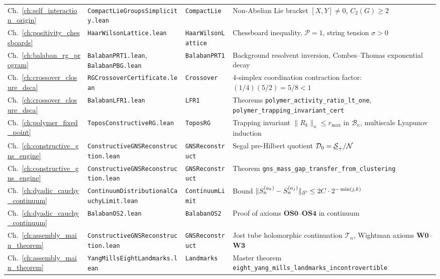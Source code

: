 \begin{table}[htbp]
\begin{tabular}{lllp{5.5cm}}
Ch.~\ref{ch:self_interaction_origin} & \texttt{CompactLieGroupsSimplicity.lean} & \texttt{CompactLie} & Non-Abelian Lie bracket $[X, Y] \ne 0$, $C_2(G) \ge 2$ \\
Ch.~\ref{ch:positivity_chessboards} & \texttt{HaarWilsonLattice.lean} & \texttt{HaarWilsonLattice} & Chessboard inequality, $\mathcal{P}=1$, string tension $\sigma > 0$ \\
Ch.~\ref{ch:balaban_rg_program} & \texttt{BalabanPRT1.lean}, \texttt{BalabanPBG.lean} & \texttt{BalabanPRT1} & Background resolvent inversion, Combes--Thomas exponential decay \\
Ch.~\ref{ch:crossover_closure_dsca} & \texttt{RGCrossoverCertificate.lean} & \texttt{Crossover} & 4-simplex coordination contraction factor: $(1/4)(5/2) = 5/8 < 1$ \\
Ch.~\ref{ch:crossover_closure_dsca} & \texttt{BalabanLFR1.lean} & \texttt{LFR1} & Theorems \texttt{polymer\_activity\_ratio\_lt\_one}, \texttt{polymer\_trapping\_invariant\_cert} \\
Ch.~\ref{ch:polymer_fixed_point} & \texttt{ToposConstructiveRG.lean} & \texttt{ToposRG} & Trapping invariant $\|R_k\|_\kappa \le r_{\max}$ in $\mathcal{B}_\kappa$, multiscale Lyapunov induction \\
Ch.~\ref{ch:constructive_gns_engine} & \texttt{ConstructiveGNSReconstruction.lean} & \texttt{GNSReconstruct} & Segal pre-Hilbert quotient $\mathcal{D}_0 = \underline{\mathcal{S}}_+ / \mathcal{N}$ \\
Ch.~\ref{ch:constructive_gns_engine} & \texttt{ConstructiveGNSReconstruction.lean} & \texttt{GNSReconstruct} & Theorem \texttt{gns\_mass\_gap\_transfer\_from\_clustering} \\
Ch.~\ref{ch:dyadic_cauchy_continuum} & \texttt{ContinuumDistributionalCauchyLimit.lean} & \texttt{ContinuumLimit} & Bound $\|S_n^{(a_k)} - S_n^{(a_j)}\|_{\mathcal{S}'} \le 2C \cdot 2^{-\min(j, k)}$ \\
Ch.~\ref{ch:dyadic_cauchy_continuum} & \texttt{BalabanOS2.lean} & \texttt{BalabanOS2} & Proof of axioms $\mathbf{OS0}$--$\mathbf{OS4}$ in continuum \\
Ch.~\ref{ch:assembly_main_theorem} & \texttt{ConstructiveGNSReconstruction.lean} & \texttt{GNSReconstruct} & Jost tube holomorphic continuation $\mathcal{T}_n$, Wightman axioms $\mathbf{W0}$--$\mathbf{W3}$ \\
Ch.~\ref{ch:assembly_main_theorem} & \texttt{YangMillsEightLandmarks.lean} & \texttt{Landmarks} & Master theorem \texttt{eight\_yang\_mills\_landmarks\_incontrovertible} \\
\bottomrule
\end{tabular}
\end{table}

